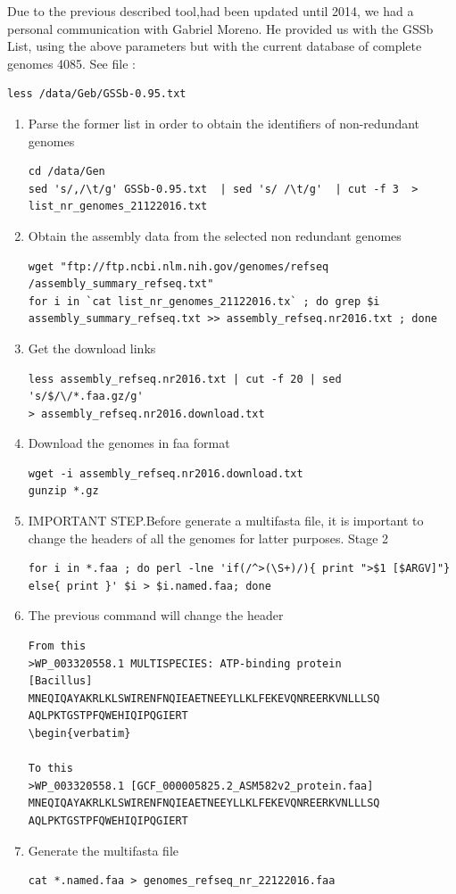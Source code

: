 \documentclass[12pt]{report}
\begin{document}
Due to the previous described tool,had been updated until 2014, we had a
personal communication with Gabriel Moreno. He provided us with the  GSSb List,
using the above parameters but with the current database of complete genomes
4085. See file :
\begin{verbatim}
less /data/Geb/GSSb-0.95.txt
\end{verbatim}
\begin{enumerate} 
\item Parse the former list in order to obtain the identifiers of non-redundant
genomes
\begin{verbatim}
cd /data/Gen
sed 's/,/\t/g' GSSb-0.95.txt  | sed 's/ /\t/g'  | cut -f 3  > 
list_nr_genomes_21122016.txt
\end{verbatim}
\item Obtain the assembly data from the selected non redundant genomes 
\begin{verbatim}
wget "ftp://ftp.ncbi.nlm.nih.gov/genomes/refseq
/assembly_summary_refseq.txt" 
for i in `cat list_nr_genomes_21122016.tx` ; do grep $i 
assembly_summary_refseq.txt >> assembly_refseq.nr2016.txt ; done
\end{verbatim}
\item Get the download links 
\begin{verbatim}
less assembly_refseq.nr2016.txt | cut -f 20 | sed 's/$/\/*.faa.gz/g' 
> assembly_refseq.nr2016.download.txt
\end{verbatim}
\item Download the genomes in faa format  
\begin{verbatim}
wget -i assembly_refseq.nr2016.download.txt
gunzip *.gz 
\end{verbatim}
\item IMPORTANT STEP.Before generate a multifasta file, it is important to
change the headers of all the genomes for latter purposes. Stage 2
\begin{verbatim}
for i in *.faa ; do perl -lne 'if(/^>(\S+)/){ print ">$1 [$ARGV]"} 
else{ print }' $i > $i.named.faa; done
\end{verbatim}
\item The previous command  will change the header  
\begin{verbatim}
From this 
>WP_003320558.1 MULTISPECIES: ATP-binding protein 
[Bacillus]
MNEQIQAYAKRLKLSWIRENFNQIEAETNEEYLLKLFEKEVQNREERKVNLLLSQ
AQLPKTGSTPFQWEHIQIPQGIERT
\begin{verbatim}

To this 
>WP_003320558.1 [GCF_000005825.2_ASM582v2_protein.faa]
MNEQIQAYAKRLKLSWIRENFNQIEAETNEEYLLKLFEKEVQNREERKVNLLLSQ
AQLPKTGSTPFQWEHIQIPQGIERT
\end{verbatim}
\item  Generate the multifasta file 
\begin{verbatim}
cat *.named.faa > genomes_refseq_nr_22122016.faa
\end{verbatim}


\end{enumerate}
\end{document}

